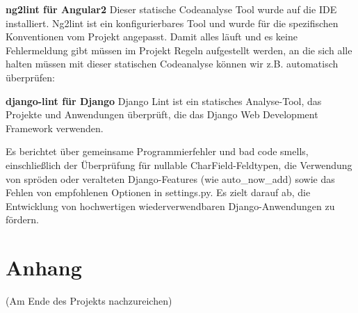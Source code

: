 \documentclass[accentcolor=tud0b,12pt,paper=a4]{tudreport}
\begin{document}
\textbf{ng2lint für Angular2}
Dieser statische Codeanalyse Tool wurde auf die IDE installiert. Ng2lint ist ein konfigurierbares Tool und wurde für die spezifischen Konventionen vom Projekt angepasst. Damit alles läuft und es keine Fehlermeldung gibt müssen im Projekt Regeln aufgestellt werden, an die sich alle halten müssen mit dieser statischen Codeanalyse können wir z.B. automatisch überprüfen:

\textbf{django-lint für Django}
Django Lint ist ein statisches Analyse-Tool, das Projekte und Anwendungen überprüft, die das Django Web Development Framework verwenden.

Es berichtet über gemeinsame Programmierfehler und bad code smells, einschließlich der Überprüfung für nullable CharField-Feldtypen, die Verwendung von spröden oder veralteten Django-Features (wie auto_now_add) sowie das Fehlen von empfohlenen Optionen in settings.py. Es zielt darauf ab, die Entwicklung von hochwertigen wiederverwendbaren Django-Anwendungen zu fördern.



\appendix
	\chapter{Anhang}
		(Am Ende des Projekts nachzureichen)\\
\end{document}
